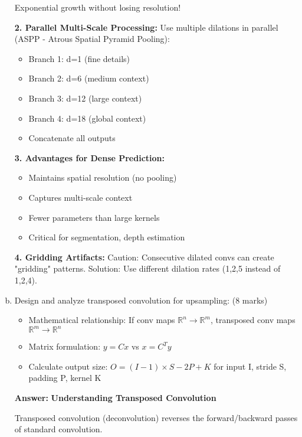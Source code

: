 \documentclass[12pt]{article}
\newcommand{\answer}[1]{{\color{answercolor}\textbf{Answer:} #1}}
\newcommand{\explanation}[1]{{\color{explanationcolor}#1}}
\begin{document}
\begin{enumerate}[(a)]
{{    Exponential growth without losing resolution!
    
    \textbf{2. Parallel Multi-Scale Processing:}
    Use multiple dilations in parallel (ASPP - Atrous Spatial Pyramid Pooling):
    \begin{itemize}
        \item Branch 1: d=1 (fine details)
        \item Branch 2: d=6 (medium context)
        \item Branch 3: d=12 (large context)
        \item Branch 4: d=18 (global context)
        \item Concatenate all outputs
    \end{itemize}
    
    \textbf{3. Advantages for Dense Prediction:}
    \begin{itemize}
        \item Maintains spatial resolution (no pooling)
        \item Captures multi-scale context
        \item Fewer parameters than large kernels
        \item Critical for segmentation, depth estimation
    \end{itemize}
    
    \textbf{4. Gridding Artifacts:}
    Caution: Consecutive dilated convs can create "gridding" patterns. Solution: Use different dilation rates (1,2,5 instead of 1,2,4).
    }
    }
    
    \item Design and analyze transposed convolution for upsampling: \hfill (8 marks)
    \begin{itemize}
        \item Mathematical relationship: If conv maps $\mathbb{R}^n \rightarrow \mathbb{R}^m$, transposed conv maps $\mathbb{R}^m \rightarrow \mathbb{R}^n$
        \item Matrix formulation: $y = Cx$ vs $x = C^T y$
        \item Calculate output size: $O = (I-1) \times S - 2P + K$ for input I, stride S, padding P, kernel K
    \end{itemize}
    
    \answer{
    \textbf{Understanding Transposed Convolution}
    
    \explanation{
    Transposed convolution (deconvolution) reverses the forward/backward passes of standard convolution.
    
}}
\end{enumerate}
\end{document}
